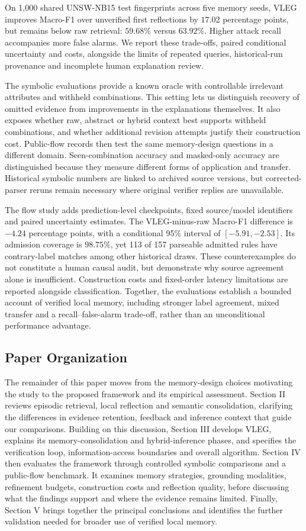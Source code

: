 \documentclass[onecolumn]{IEEEtran}
\numberwithin{equation}{section}
\theoremstyle{definition}
\theoremstyle{remark}
\begin{document}
On 1,000 shared UNSW-NB15 test fingerprints across five memory seeds, VLEG improves Macro-F1 over unverified first reflections by $17.02$ percentage points, but remains below raw retrieval: $59.68\%$ versus $63.92\%$. Higher attack recall accompanies more false alarms. We report these trade-offs, paired conditional uncertainty and costs, alongside the limits of repeated queries, historical-run provenance and incomplete human explanation review.

The symbolic evaluations provide a known oracle with controllable irrelevant attributes and withheld combinations. This setting lets us distinguish recovery of omitted evidence from improvements in the explanations themselves. It also exposes whether raw, abstract or hybrid context best supports withheld combinations, and whether additional revision attempts justify their construction cost. Public-flow records then test the same memory-design questions in a different domain. Seen-combination accuracy and masked-only accuracy are distinguished because they measure different forms of application and transfer. Historical symbolic numbers are linked to archived source versions, but corrected-parser reruns remain necessary where original verifier replies are unavailable.

The flow study adds prediction-level checkpoints, fixed source/model identifiers and paired uncertainty estimates. The VLEG-minus-raw Macro-F1 difference is $-4.24$ percentage points, with a conditional 95\% interval of $[-5.91,-2.53]$. Its admission coverage is $98.75\%$, yet 113 of 157 parseable admitted rules have contrary-label matches among other historical draws. These counterexamples do not constitute a human causal audit, but demonstrate why source agreement alone is insufficient. Construction costs and fixed-order latency limitations are reported alongside classification. Together, the evaluations establish a bounded account of verified local memory, including stronger label agreement, mixed transfer and a recall--false-alarm trade-off, rather than an unconditional performance advantage.

\subsection{Paper Organization}
The remainder of this paper moves from the memory-design choices motivating the study to the proposed framework and its empirical assessment. Section II reviews episodic retrieval, local reflection and semantic consolidation, clarifying the differences in evidence retention, feedback and inference context that guide our comparisons. Building on this discussion, Section III develops VLEG, explains its memory-consolidation and hybrid-inference phases, and specifies the verification loop, information-access boundaries and overall algorithm. Section IV then evaluates the framework through controlled symbolic comparisons and a public-flow benchmark. It examines memory strategies, grounding modalities, refinement budgets, construction costs and reflection quality, before discussing what the findings support and where the evidence remains limited. Finally, Section V brings together the principal conclusions and identifies the further validation needed for broader use of verified local memory.
\end{document}
